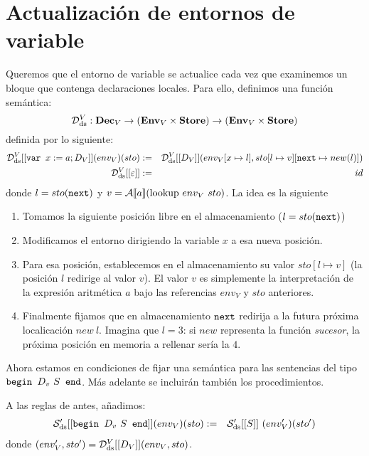 \section{Actualización de entornos de variable}

Queremos que el entorno de variable se actualice cada vez que examinemos un bloque que contenga declaraciones locales. Para ello, definimos una función semántica:
$$\mathcal{D}_{\mathrm{ds}}^V: \mathbf{Dec}_V \to (\mathbf{Env}_V \times \mathbf{Store})\to (\mathbf{Env}_V \times \mathbf{Store})$$
definida por lo siguiente:
\begin{eqnarray*}
    \mathcal{D}_{\mathrm{ds}}^V [[\texttt{var } x:=a; D_V]](env_V)(sto) &:=& \mathcal{D}_{\mathrm{ds}}^V[[D_V]](env_V[x\mapsto l], sto[l\mapsto v][\texttt{next}\mapsto new(l)])\\
    \mathcal{D}_{\mathrm{ds}}^V [[\varepsilon]] &:=& id
\end{eqnarray*}
donde $l = sto(\texttt{next})$ y $v = \mathcal{A}[\![a]\!](\mathrm{lookup}\ env_V\ sto)$. La idea es la siguiente
\begin{enumerate}
    \item Tomamos la siguiente posición libre en el almacenamiento ($l = sto(\texttt{next})$)
    \item Modificamos el entorno dirigiendo la variable $x$ a esa nueva posición.
    \item Para esa posición, establecemos en el almacenamiento su valor $sto[l\mapsto v]$ (la posición $l$ redirige al valor $v$). El valor $v$ es simplemente la interpretación de la expresión aritmética $a$ bajo las referencias $env_V$ y $sto$ anteriores.
    \item Finalmente fijamos que en almacenamiento $\texttt{next}$ redirija a la futura próxima localicación $new\ l$. Imagina que $l = 3$: si $new$ representa la función \textit{sucesor}, la próxima posición en memoria a rellenar sería la $4$.
\end{enumerate}
Ahora estamos en condiciones de fijar una semántica para las sentencias del tipo $\texttt{begin } D_v\ S \texttt{ end}$. Más adelante se incluirán también los procedimientos.
\begin{sist*}
A las reglas de antes, añadimos:
\begin{eqnarray*}
    \mathcal{S}'_{\mathrm{ds}} [[\texttt{begin } D_v\ S \texttt{ end}]](env_V)(sto) &:=&  \mathcal{S}'_{\mathrm{ds}} [[S]]\ (env_V')(sto')
\end{eqnarray*}
donde $(env_V', sto') = \mathcal{D}_{\mathrm{ds}}^V [[D_V]](env_V, sto)$.
\end{sist*}

